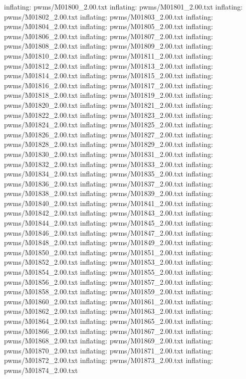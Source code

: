 \documentclass[letterpaper,10pt,english]{sphinxmanual}
\begin{document}
{\begin{sphinxVerbatim}[commandchars=\\\{\}]
  inflating: pwms/M01800\_2.00.txt
  inflating: pwms/M01801\_2.00.txt
  inflating: pwms/M01802\_2.00.txt
  inflating: pwms/M01803\_2.00.txt
  inflating: pwms/M01804\_2.00.txt
  inflating: pwms/M01805\_2.00.txt
  inflating: pwms/M01806\_2.00.txt
  inflating: pwms/M01807\_2.00.txt
  inflating: pwms/M01808\_2.00.txt
  inflating: pwms/M01809\_2.00.txt
  inflating: pwms/M01810\_2.00.txt
  inflating: pwms/M01811\_2.00.txt
  inflating: pwms/M01812\_2.00.txt
  inflating: pwms/M01813\_2.00.txt
  inflating: pwms/M01814\_2.00.txt
  inflating: pwms/M01815\_2.00.txt
  inflating: pwms/M01816\_2.00.txt
  inflating: pwms/M01817\_2.00.txt
  inflating: pwms/M01818\_2.00.txt
  inflating: pwms/M01819\_2.00.txt
  inflating: pwms/M01820\_2.00.txt
  inflating: pwms/M01821\_2.00.txt
  inflating: pwms/M01822\_2.00.txt
  inflating: pwms/M01823\_2.00.txt
  inflating: pwms/M01824\_2.00.txt
  inflating: pwms/M01825\_2.00.txt
  inflating: pwms/M01826\_2.00.txt
  inflating: pwms/M01827\_2.00.txt
  inflating: pwms/M01828\_2.00.txt
  inflating: pwms/M01829\_2.00.txt
  inflating: pwms/M01830\_2.00.txt
  inflating: pwms/M01831\_2.00.txt
  inflating: pwms/M01832\_2.00.txt
  inflating: pwms/M01833\_2.00.txt
  inflating: pwms/M01834\_2.00.txt
  inflating: pwms/M01835\_2.00.txt
  inflating: pwms/M01836\_2.00.txt
  inflating: pwms/M01837\_2.00.txt
  inflating: pwms/M01838\_2.00.txt
  inflating: pwms/M01839\_2.00.txt
  inflating: pwms/M01840\_2.00.txt
  inflating: pwms/M01841\_2.00.txt
  inflating: pwms/M01842\_2.00.txt
  inflating: pwms/M01843\_2.00.txt
  inflating: pwms/M01844\_2.00.txt
  inflating: pwms/M01845\_2.00.txt
  inflating: pwms/M01846\_2.00.txt
  inflating: pwms/M01847\_2.00.txt
  inflating: pwms/M01848\_2.00.txt
  inflating: pwms/M01849\_2.00.txt
  inflating: pwms/M01850\_2.00.txt
  inflating: pwms/M01851\_2.00.txt
  inflating: pwms/M01852\_2.00.txt
  inflating: pwms/M01853\_2.00.txt
  inflating: pwms/M01854\_2.00.txt
  inflating: pwms/M01855\_2.00.txt
  inflating: pwms/M01856\_2.00.txt
  inflating: pwms/M01857\_2.00.txt
  inflating: pwms/M01858\_2.00.txt
  inflating: pwms/M01859\_2.00.txt
  inflating: pwms/M01860\_2.00.txt
  inflating: pwms/M01861\_2.00.txt
  inflating: pwms/M01862\_2.00.txt
  inflating: pwms/M01863\_2.00.txt
  inflating: pwms/M01864\_2.00.txt
  inflating: pwms/M01865\_2.00.txt
  inflating: pwms/M01866\_2.00.txt
  inflating: pwms/M01867\_2.00.txt
  inflating: pwms/M01868\_2.00.txt
  inflating: pwms/M01869\_2.00.txt
  inflating: pwms/M01870\_2.00.txt
  inflating: pwms/M01871\_2.00.txt
  inflating: pwms/M01872\_2.00.txt
  inflating: pwms/M01873\_2.00.txt
  inflating: pwms/M01874\_2.00.txt

\end{sphinxVerbatim}}
\end{document}
